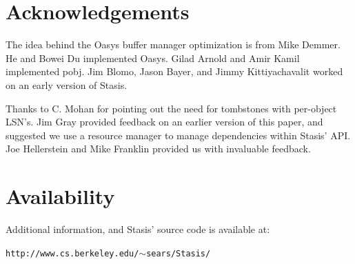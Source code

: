 \documentclass[letterpaper,twocolumn,10pt]{article}
\newcommand{\yad}{Stasis\xspace}
\newcommand{\yads}{Stasis'\xspace}
\newcommand{\oasys}{Oasys\xspace}
\begin{document}
\section{Acknowledgements}

The idea behind the \oasys buffer manager optimization is from Mike
Demmer.  He and Bowei Du implemented \oasys.  Gilad Arnold and Amir Kamil implemented
 pobj.  Jim Blomo, Jason Bayer, and Jimmy
Kittiyachavalit worked on an early version of \yad.

Thanks to C. Mohan for pointing out the need for tombstones with
per-object LSN's.  Jim Gray provided feedback on an earlier version of
this paper, and suggested we use a resource manager to manage
dependencies within \yads API.  Joe Hellerstein and Mike Franklin
provided us with invaluable feedback.

\section{Availability}

Additional information, and \yads source code is available at:

\begin{center}
{\small{\tt http://www.cs.berkeley.edu/\ensuremath{\sim}sears/\yad/}}
\end{center}

{\footnotesize 
\nocite{*}
}

\theendnotes
\end{document}

